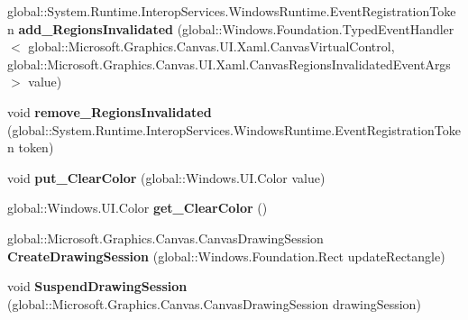 \begin{DoxyCompactItemize}
global\+::\+System.\+Runtime.\+Interop\+Services.\+Windows\+Runtime.\+Event\+Registration\+Token {\bfseries add\+\_\+\+Regions\+Invalidated} (global\+::\+Windows.\+Foundation.\+Typed\+Event\+Handler$<$ global\+::\+Microsoft.\+Graphics.\+Canvas.\+U\+I.\+Xaml.\+Canvas\+Virtual\+Control, global\+::\+Microsoft.\+Graphics.\+Canvas.\+U\+I.\+Xaml.\+Canvas\+Regions\+Invalidated\+Event\+Args $>$ value)
\item 
\mbox{\label{interface_microsoft_1_1_graphics_1_1_canvas_1_1_u_i_1_1_xaml_1_1_i_canvas_virtual_control_afe949e744dadc9f5e39dfec072c67406}} 
void {\bfseries remove\+\_\+\+Regions\+Invalidated} (global\+::\+System.\+Runtime.\+Interop\+Services.\+Windows\+Runtime.\+Event\+Registration\+Token token)
\item 
\mbox{\label{interface_microsoft_1_1_graphics_1_1_canvas_1_1_u_i_1_1_xaml_1_1_i_canvas_virtual_control_a84b465dc31a0ee833f01ee8a2c9191af}} 
void {\bfseries put\+\_\+\+Clear\+Color} (global\+::\+Windows.\+U\+I.\+Color value)
\item 
\mbox{\label{interface_microsoft_1_1_graphics_1_1_canvas_1_1_u_i_1_1_xaml_1_1_i_canvas_virtual_control_a69a389035bbca3cc303b09429c228178}} 
global\+::\+Windows.\+U\+I.\+Color {\bfseries get\+\_\+\+Clear\+Color} ()
\item 
\mbox{\label{interface_microsoft_1_1_graphics_1_1_canvas_1_1_u_i_1_1_xaml_1_1_i_canvas_virtual_control_a0554619052150d743418f63c5cef0641}} 
global\+::\+Microsoft.\+Graphics.\+Canvas.\+Canvas\+Drawing\+Session {\bfseries Create\+Drawing\+Session} (global\+::\+Windows.\+Foundation.\+Rect update\+Rectangle)
\item 
\mbox{\label{interface_microsoft_1_1_graphics_1_1_canvas_1_1_u_i_1_1_xaml_1_1_i_canvas_virtual_control_a863b7d9556ff253f2f17ac57251ccd59}} 
void {\bfseries Suspend\+Drawing\+Session} (global\+::\+Microsoft.\+Graphics.\+Canvas.\+Canvas\+Drawing\+Session drawing\+Session)

\end{DoxyCompactItemize}
